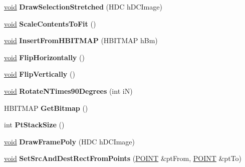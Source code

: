 \begin{DoxyCompactItemize}
\item 
\mbox{\label{class_selection_model_a56ce445366d75a041010c0ac8c0a9694}} 
\hyperlink{interfacevoid}{void} {\bfseries Draw\+Selection\+Stretched} (H\+DC h\+D\+C\+Image)
\item 
\mbox{\label{class_selection_model_a1e2a47b24566bc8e11f2534b237ad2cc}} 
\hyperlink{interfacevoid}{void} {\bfseries Scale\+Contents\+To\+Fit} ()
\item 
\mbox{\label{class_selection_model_ae9c64ce2523681c02584e5c1c7edf046}} 
\hyperlink{interfacevoid}{void} {\bfseries Insert\+From\+H\+B\+I\+T\+M\+AP} (H\+B\+I\+T\+M\+AP h\+Bm)
\item 
\mbox{\label{class_selection_model_a32a55fa6f2a4edb2cdabae32e4f04f66}} 
\hyperlink{interfacevoid}{void} {\bfseries Flip\+Horizontally} ()
\item 
\mbox{\label{class_selection_model_a3eedda1ca2ff4a97cbaedb1cfcff5188}} 
\hyperlink{interfacevoid}{void} {\bfseries Flip\+Vertically} ()
\item 
\mbox{\label{class_selection_model_a13a1c5a1291291d782cc3b04e567faa2}} 
\hyperlink{interfacevoid}{void} {\bfseries Rotate\+N\+Times90\+Degrees} (int iN)
\item 
\mbox{\label{class_selection_model_a55403a0fd474841960957d93f43bd038}} 
H\+B\+I\+T\+M\+AP {\bfseries Get\+Bitmap} ()
\item 
\mbox{\label{class_selection_model_a51ce73ea44033ca7ad0e8271f4e5809d}} 
int {\bfseries Pt\+Stack\+Size} ()
\item 
\mbox{\label{class_selection_model_ad182029ec7639c8fbb194cf187e55fda}} 
\hyperlink{interfacevoid}{void} {\bfseries Draw\+Frame\+Poly} (H\+DC h\+D\+C\+Image)
\item 
\mbox{\label{class_selection_model_af063f4a7d4ae4e374a8cd0c470c5c9f7}} 
\hyperlink{interfacevoid}{void} {\bfseries Set\+Src\+And\+Dest\+Rect\+From\+Points} (\hyperlink{structtag_p_o_i_n_t}{P\+O\+I\+NT} \&pt\+From, \hyperlink{structtag_p_o_i_n_t}{P\+O\+I\+NT} \&pt\+To)

\end{DoxyCompactItemize}
